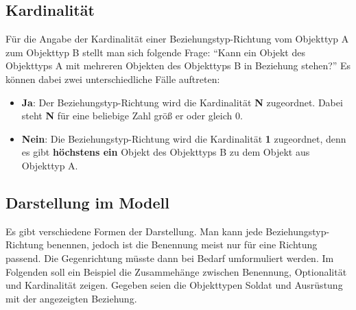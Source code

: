         \subsection{Kardinalität}
          Für die Angabe der Kardinalität einer Beziehungstyp-Richtung vom Objekttyp A zum Objekttyp B stellt man sich folgende Frage: \enquote{Kann ein Objekt des Objekttyps A mit mehreren Objekten des Objekttyps B in Beziehung stehen?} Es können dabei zwei unterschiedliche Fälle auftreten:
\clearpage
          \begin{itemize}
            \item \textbf{Ja}: Der Beziehungstyp-Richtung wird die Kardinalität \textbf{N} zugeordnet. Dabei steht \textbf{N} für eine beliebige Zahl größ er oder gleich 0.
            \item \textbf{Nein}: Die Beziehungstyp-Richtung wird die Kardinalität \textbf{1} zugeordnet, denn es gibt \textbf{höchstens ein} Objekt des Objekttyps B zu dem Objekt aus Objekttyp A.
          \end{itemize}
        \subsection{Darstellung im Modell}
          Es gibt verschiedene Formen der Darstellung. Man kann jede Beziehungstyp-Richtung benennen, jedoch ist die Benennung meist nur für eine Richtung passend. Die Gegenrichtung müsste dann bei Bedarf umformuliert werden. Im Folgenden soll ein Beispiel die Zusammehänge zwischen Benennung, Optionalität und Kardinalität zeigen. Gegeben seien die Objekttypen Soldat und Ausrüstung mit der angezeigten Beziehung.

